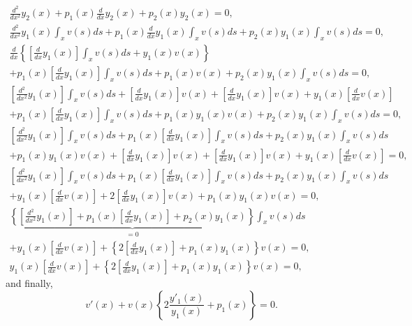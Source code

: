 \begin{equation*}
\begin{split}
\frac{d^2}{dx^2}y_2(x) +   p_1  (x)    \frac{d}{dx}y_2(x)+    p_2  (x)   y_2(x)
 =
0, \\
\frac{d^2}{dx^2}y_1(x)\int_x  v(s) ds +   p_1  (x)    \frac{d}{dx}y_1(x)\int_x  v(s) ds+    p_2  (x)   y_1(x)\int_x  v(s) ds
 =
0, \\
\frac{d }{dx }\left\{
\left[\frac{d }{dx }y_1(x)\right]\int_x  v(s) ds
+y_1(x)   v(x)  \right\} \qquad  \\
+   p_1  (x)    \left[\frac{d}{dx}y_1(x)\right] \int_x  v(s) ds + p_1(x)   v(x)
+   p_2 (x)  y_1(x)\int_x  v(s) ds
 =
0, \\
\left[ \frac{d^2 }{dx^2 }y_1(x)\right] \int_x  v(s) ds
+\left[ \frac{d  }{dx  }y_1(x)\right]    v(x)
+\left[ \frac{d  }{dx  }y_1(x)\right]    v(x)
+y_1(x)  \left[ \frac{d  }{dx  } v(x) \right]    \\
+   p_1  (x)    \left[ \frac{d}{dx}y_1(x)\right] \int_x  v(s) ds + p_1  (x)   y_1(x)   v(x)
+   p_2 (x)  y_1(x)\int_x  v(s) ds
 =
0, \\
\left[ \frac{d^2 }{dx^2 }y_1(x)\right] \int_x  v(s) ds
+   p_1  (x)    \left[ \frac{d}{dx}y_1(x)\right] \int_x  v(s) ds
+   p_2 (x)  y_1(x)\int_x  v(s) ds    \quad   \\
+   p_1  (x)   y_1(x)   v(x)
+\left[ \frac{d  }{dx  }y_1(x)\right]    v(x)
+\left[ \frac{d  }{dx  }y_1(x)\right]    v(x)
+y_1(x)  \left[ \frac{d  }{dx  } v(x) \right]
 =
0, \\
\left[ \frac{d^2 }{dx^2 }y_1(x)\right] \int_x  v(s) ds
+   p_1  (x)    \left[ \frac{d}{dx}y_1(x)\right] \int_x  v(s) ds
+   p_2 (x)  y_1(x)\int_x  v(s) ds   \quad     \\
+y_1(x)  \left[ \frac{d  }{dx  } v(x) \right]
+2\left[ \frac{d  }{dx  }y_1(x)\right]    v(x)
 +   p_1  (x)   y_1(x)   v(x)
 =
0, \\
\underbrace{\left\{\left[ \frac{d^2 }{dx^2 }y_1(x)\right]
+   p_1  (x)    \left[ \frac{d}{dx}y_1(x)\right]
+   p_2 (x)  y_1(x)\right\}}_{=0}\int_x  v(s) ds     \qquad   \\
+y_1(x)  \left[ \frac{d  }{dx  } v(x) \right]
+\left\{ 2\left[ \frac{d  }{dx  }y_1(x)\right]
  +   p_1  (x)   y_1(x) \right\}  v(x)
 =
0, \\
 y_1(x)  \left[ \frac{d  }{dx  } v(x) \right]
+\left\{ 2\left[ \frac{d  }{dx  }y_1(x)\right]
  +   p_1  (x)   y_1(x) \right\}  v(x)
 =
0,
\end{split}
\end{equation*}
and finally,
\begin{equation}
      v'(x)  +  v(x)    \left\{ 2 \frac{y'_1(x)}{y_1(x)}    +   p_1  (x)   \right\} = 0.
\label{2011-m-ch-sf-fc2123}
\end{equation}



